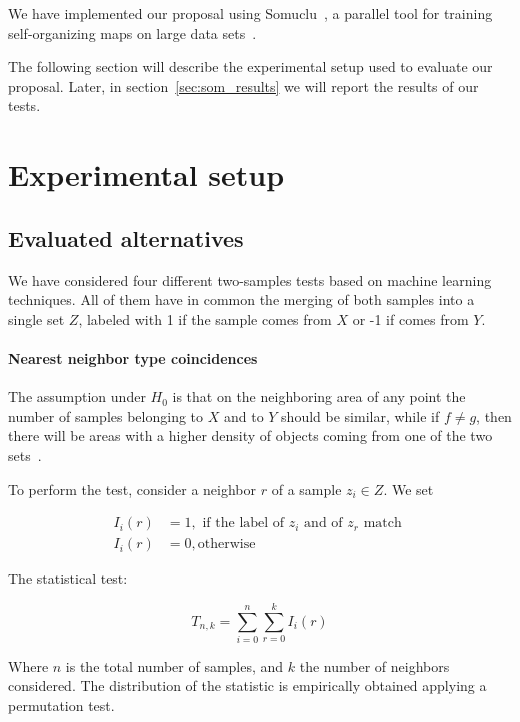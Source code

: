 We have implemented our proposal using Somuclu~\cite{wittek2013somoclu}, a parallel
tool for training self-organizing maps on large data sets~\cite{wittek2013somoclu}.

The following section will describe the experimental setup used to evaluate our proposal.
Later, in section~\ref{sec:som_results} we will report the results of our tests.

\section{Experimental setup}
\label{sec:som_exp_setup}

\subsection{Evaluated alternatives}

We have considered four different two-samples tests based on machine learning techniques.
All of them have in common the merging of both samples into a single set $Z$,
labeled with 1 if the sample comes from $X$ or -1 if comes from $Y$.

\paragraph{Nearest neighbor type coincidences}

The assumption under $H_0$ is that on the neighboring area of any point the number of samples
belonging to $X$ and to $Y$ should be similar, while if $f \neq g$, then there will be areas with
a higher density of objects coming from one of the two sets~\cite{Henze1988,Schilling1986b}.

To perform the test, consider a neighbor $r$ of a sample $z_i \in Z$. We set

\begin{equation}
\begin{split}
    I_i(r) &= 1, \textrm{ if the label of } z_i \textrm{ and of } z_r \textrm{ match }\\
    I_i(r) &= 0, \textrm{otherwise}
\end{split}
\end{equation}

The statistical test:

\begin{equation}
    T_{n,k} = \sum_{i=0}^{n}\sum_{r=0}^{k} I_i(r)
\end{equation}

Where $n$ is the total number of samples, and $k$ the number of neighbors considered.
The distribution of the statistic is empirically obtained applying a permutation test.
 
